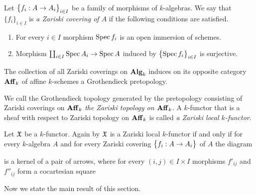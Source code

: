 \begin{definition}
Let $\big\{f_i:A\rightarrow A_i\big\}_{i\in I}$ be a family of morphisms of $k$-algebras. We say that $\{f_i\}_{i\in I}$ is \textit{a Zariski covering of $A$} if the following conditions are satisfied.
\begin{enumerate}[label=\textbf{(\arabic*)}, leftmargin=1.5em]
\item For every $i\in I$ morphism $\mathrm{Spec}\, f_i$ is an open immersion of schemes.
\item Morphism $\coprod_{i\in I}\mathrm{Spec}\, A_i\rightarrow \mathrm{Spec}\, A$ induced by $\big\{\mathrm{Spec}\, f_i\big\}_{i\in I}$ is surjective.
\end{enumerate}
\end{definition}
\noindent
The collection of all Zariski coverings on $\mathbf{Alg}_k$ induces on its opposite category $\mathbf{Aff}_k$ of affine $k$-schemes a Grothendieck pretopology.

\begin{definition}
We call the Grothendieck topology generated by the pretopology consisting of Zariski coverings on $\mathbf{Aff}_k$ \textit{the Zariski topology on $\mathbf{Aff}_k$}. A $k$-functor that is a sheaf with respect to Zariski topology on $\mathbf{Aff}_k$ is called \textit{a Zariski local $k$-functor}.
\end{definition}
\noindent
Let ${\mathfrak X}$ be a $k$-functor. Again by {\cite[Theorem 3.5]{Sheaves}} ${\mathfrak X}$ is a Zariski local $k$-functor if and only if for every $k$-algebra $A$ and for every Zariski covering $\big\{f_i:A\rightarrow A_i\big\}$ of $A$ the diagram
\begin{center}
\end{center}
is a kernel of a pair of arrows, where for every $(i,j)\in I\times I$ morphisms $f'_{ij}$ and $f''_{ij}$ form a cocartesian square
\begin{center}
\end{center}
\noindent
Now we state the main result of this section.

